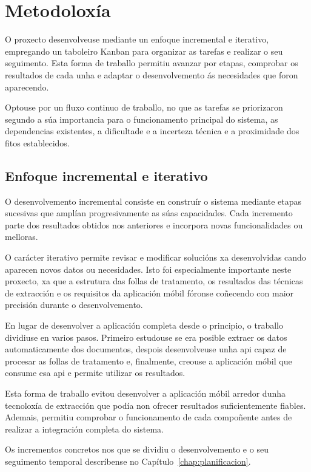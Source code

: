 \chapter{Metodoloxía}
\label{chap:metodoloxia}

O proxecto desenvolveuse mediante un enfoque incremental e iterativo, empregando un taboleiro Kanban para organizar as tarefas e realizar o seu seguimento. Esta forma de traballo permitiu avanzar por etapas, comprobar os resultados de cada unha e adaptar o desenvolvemento ás necesidades que foron aparecendo.

Optouse por un fluxo continuo de traballo, no que as tarefas se priorizaron segundo a súa importancia para o funcionamento principal do sistema, as dependencias existentes, a dificultade e a incerteza técnica e a proximidade dos fitos establecidos.

\section{Enfoque incremental e iterativo}

O desenvolvemento incremental consiste en construír o sistema mediante etapas sucesivas que amplían progresivamente as súas capacidades. Cada incremento parte dos resultados obtidos nos anteriores e incorpora novas funcionalidades ou melloras.

O carácter iterativo permite revisar e modificar solucións xa desenvolvidas cando aparecen novos datos ou necesidades. Isto foi especialmente importante neste proxecto, xa que a estrutura das follas de tratamento, os resultados das técnicas de extracción e os requisitos da aplicación móbil fóronse coñecendo con maior precisión durante o desenvolvemento.

En lugar de desenvolver a aplicación completa desde o principio, o traballo dividiuse en varios pasos. Primeiro estudouse se era posible extraer os datos automaticamente dos documentos, despois desenvolveuse unha \gls{api} capaz de procesar as follas de tratamento e, finalmente, creouse a aplicación móbil que consume esa \gls{api} e permite utilizar os resultados.

Esta forma de traballo evitou desenvolver a aplicación móbil arredor dunha tecnoloxía de extracción que podía non ofrecer resultados suficientemente fiables. Ademais, permitiu comprobar o funcionamento de cada compoñente antes de realizar a integración completa do sistema.

Os incrementos concretos nos que se dividiu o desenvolvemento e o seu seguimento temporal descríbense no Capítulo~\ref{chap:planificacion}.

